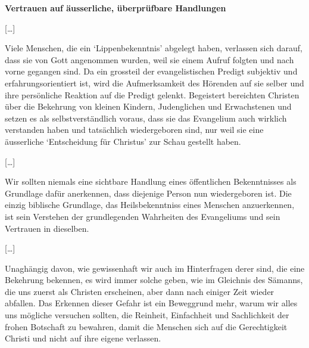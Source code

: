 \documentclass[
  12pt,
]{krantz}
\begin{document}
\textbf{Vertrauen auf äusserliche, überprüfbare Handlungen}

{[}\ldots{]}

Viele Menschen, die ein `Lippenbekenntnis' abgelegt haben, verlassen sich
darauf, dass sie von Gott angenommen wurden, weil sie einem Aufruf folgten und
nach vorne gegangen sind. Da ein grossteil der evangelistischen Predigt
subjektiv und erfahrungsorientiert ist, wird die Aufmerksamkeit des Hörenden
auf sie selber und ihre persönliche Reaktion auf die Predigt gelenkt.
Begeistert bereichten Christen über die Bekehrung von kleinen Kindern,
Judenglichen und Erwachstenen und setzen es als selbstverständlich voraus,
dass sie das Evangelium auch wirklich verstanden haben und tatsächlich
wiedergeboren sind, nur weil sie eine äusserliche `Entscheidung für Christus'
zur Schau gestellt haben.

{[}\ldots{]}

Wir sollten niemals eine sichtbare Handlung eines öffentlichen Bekenntnisses
als Grundlage dafür anerkennen, dass diejenige Person nun wiedergeboren ist.
Die einzig biblische Grundlage, das Heilsbekenntniss eines Menschen
anzuerkennen, ist sein Verstehen der grundlegenden Wahrheiten des Evangeliums
und sein Vertrauen in dieselben.

{[}\ldots{]}

Unaghängig davon, wie gewissenhaft wir auch im Hinterfragen derer sind, die
eine Bekehrung bekennen, es wird immer solche geben, wie im Gleichnis des
Sämanns, die uns zuerst als Christen erscheinen, aber dann nach einiger
Zeit wieder abfallen. Das Erkennen dieser Gefahr ist ein Beweggrund mehr,
warum wir alles uns mögliche versuchen sollten, die Reinheit, Einfachheit und
Sachlichkeit der frohen Botschaft zu bewahren, damit die Menschen sich auf
die Gerechtigkeit Christi und nicht auf ihre eigene verlassen.

  

\printindex
\end{document}
